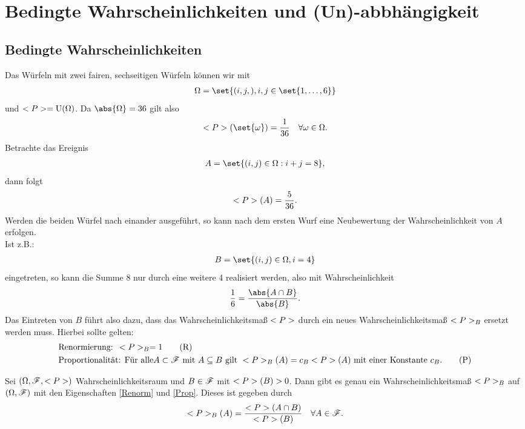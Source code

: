 \chapter{Bedingte Wahrscheinlichkeiten und (Un)-abbhängigkeit}
\section{Bedingte Wahrscheinlichkeiten}
\begin{example}
	Das Würfeln mit zwei fairen, sechseitigen Würfeln können wir mit 
	\begin{align}
		\Omega = \set{(i,j,), i,j \in \set{1,\dots,6}}\notag
	\end{align}
	und $<P> = \operatorname{U}(\Omega)$. Da $\abs{\Omega} = 36$ gilt also
	\begin{align}
		\probp(\set{\omega}) = \frac{1}{36} \quad \forall \omega \in \Omega.\notag
	\end{align}
	Betrachte das Ereignis
	\begin{align}
		A = \set{(i,j) \in \Omega : i + j = 8},\notag
	\end{align}
	dann folgt
	\begin{align}
		<P>(A) = \frac{5}{36}.\notag
	\end{align}
	Werden die beiden Würfel nach einander ausgeführt, so kann nach dem ersten Wurf eine Neubewertung der Wahrscheinlichkeit von $A$ erfolgen.\\
	Ist z.B.:
	\begin{align}
		B = \set{(i,j) \in \Omega, i = 4}\notag
	\end{align}
	eingetreten, so kann die Summe 8 nur durch eine weitere 4 realisiert werden, also mit Wahrscheinlichkeit
	\begin{align}
		\frac{1}{6} = \frac{\abs{A \cap B}}{\abs{B}}.\notag 
	\end{align}
	Das Eintreten von $B$ führt also dazu, dass das Wahrscheinlichkeitsmaß $<P>$ durch ein neues Wahrscheinlichkeitsmaß $<P>_{B}$ ersetzt werden muss. Hierbei sollte gelten:
	\begin{align} %
		 &\text{Renormierung: }\probp_{B} = 1\label{Renorm}\tag{R}\\
		 &\text{Proportionalität: Für alle} A \subset \sigF \mit A \subseteq B \text{ gilt }
		 \probp_{B}(A) = c_B \probp(A) \text{ mit einer Konstante } c_B.\label{Prop}\tag{P}
    \end{align}
\end{example}

\begin{lemma}
	Sei $(\Omega, \mathscr{F}, <P>)$ Wahrscheinlichkeitsraum und $B \in \mathscr{F}$ mit $<P>(B) > 0$. Dann gibt es genau ein Wahrscheinlichkeitsmaß $<P>_B$ auf $(\Omega, \mathscr{F})$ mit den Eigenschaften \eqref{Renorm} und \eqref{Prop}. Dieses ist gegeben durch
	\begin{align}
		<P>_{B}(A) = \frac{<P>(A\cap B)}{<P>(B)} \quad \forall A \in \mathscr{F}.\notag
	\end{align}
\end{lemma}

